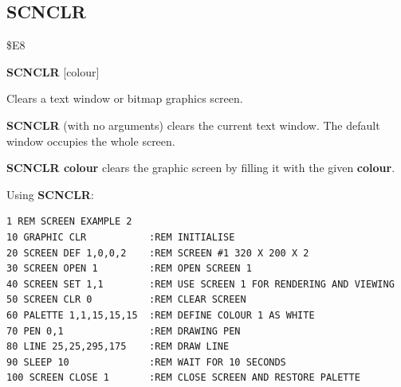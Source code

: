 
\newpage
\subsection{SCNCLR}
\begin{description}[leftmargin=2cm,style=nextline]
\item [Token:] \$E8
\item [Format:] {\bf SCNCLR} [colour]
\item [Usage:] Clears a text window or bitmap graphics screen.

               {\bf SCNCLR} (with no arguments) clears the
               current text window. The default window
               occupies the whole screen.

               {\bf SCNCLR colour} clears the graphic screen by
               filling it with the given {\bf colour}.

\item [Example:] Using {\bf SCNCLR}:
\begin{tcolorbox}[colback=black,coltext=white]
\verbatimfont{\codefont}
\begin{verbatim}
1 REM SCREEN EXAMPLE 2
10 GRAPHIC CLR           :REM INITIALISE
20 SCREEN DEF 1,0,0,2    :REM SCREEN #1 320 X 200 X 2
30 SCREEN OPEN 1         :REM OPEN SCREEN 1
40 SCREEN SET 1,1        :REM USE SCREEN 1 FOR RENDERING AND VIEWING
50 SCREEN CLR 0          :REM CLEAR SCREEN
60 PALETTE 1,1,15,15,15  :REM DEFINE COLOUR 1 AS WHITE
70 PEN 0,1               :REM DRAWING PEN
80 LINE 25,25,295,175    :REM DRAW LINE
90 SLEEP 10              :REM WAIT FOR 10 SECONDS
100 SCREEN CLOSE 1       :REM CLOSE SCREEN AND RESTORE PALETTE
\end{verbatim}
\end{tcolorbox}
\end{description}


\newpage

